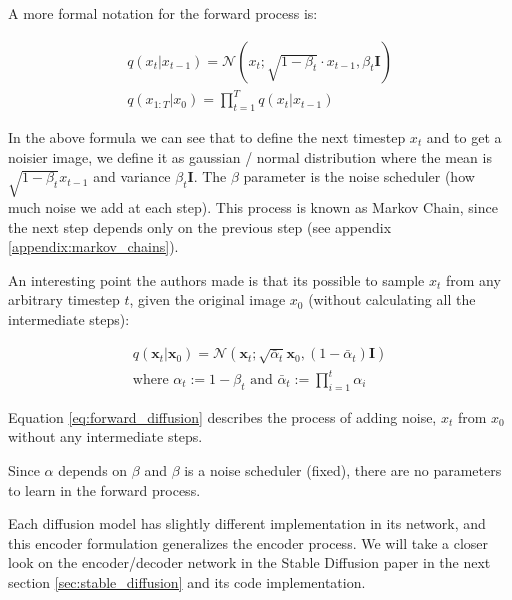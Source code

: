 A more formal notation for the forward process is:

\begin{equation*}
    \begin{aligned}
        q(x_t | x_{t-1}) = \mathcal{N}(x_t; \sqrt{1-\beta_t} \cdot x_{t-1}, \beta_t \mathbf{I}) \\
        q(x_{1:T} | x_0) = \prod_{t=1}^{T} q(x_t | x_{t-1})
    \end{aligned}
\end{equation*}

In the above formula we can see that to define the next timestep $x_t$ and to get a noisier image, we define it as gaussian / normal distribution where the mean is $\sqrt{1-\beta_t} x_{t-1}$ and variance $\beta_t \mathbf{I}$. The $\beta$ parameter is the noise scheduler (how much noise we add at each step). This process is known as Markov Chain, since the next step depends only on the previous step (see appendix \ref{appendix:markov_chains}).

An interesting point the authors made is that its possible to sample $x_t$ from any arbitrary timestep $t$, given the original image $x_0$ (without calculating all the intermediate steps):

\begin{equation}
    \begin{aligned}
    q(\mathbf{x}_t|\mathbf{x}_0) = \mathcal{N}(\mathbf{x}_t; \sqrt{\bar{\alpha}_t}\mathbf{x}_0, (1 - \bar{\alpha}_t)\mathbf{I}) \\
    \text{where } \alpha_t := 1 - \beta_t \text{ and } \bar{\alpha}_t := \prod_{i=1}^{t} \alpha_i
    \end{aligned}
    \label{eq:forward_diffusion}
\end{equation}

Equation \ref{eq:forward_diffusion} describes the process of adding noise, $x_t$ from $x_0$ without any intermediate steps.

Since $\alpha$ depends on $\beta$ and $\beta$ is a noise scheduler (fixed), there are no parameters to learn in the forward process.

Each diffusion model has slightly different implementation in its network, and this encoder formulation generalizes the encoder process. We will take a closer look on the encoder/decoder network in the Stable Diffusion paper \cite{stable_diffusion} in the next section \ref{sec:stable_diffusion} and its code implementation.










